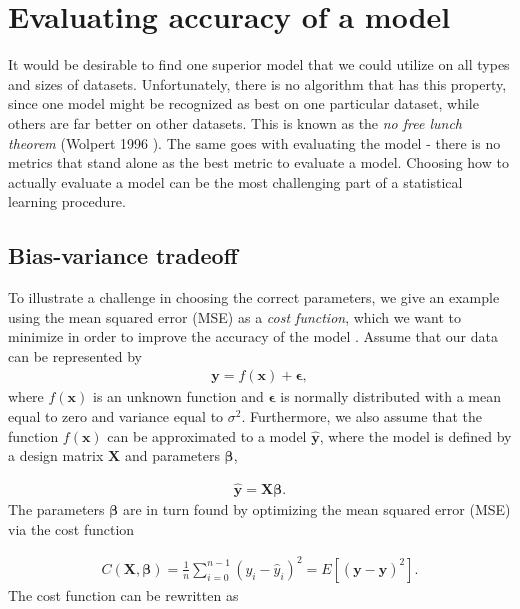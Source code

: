 \section{Evaluating accuracy of a model}
\label{evaluating accuracy}
It would be desirable to find one superior model that we could utilize on all types and sizes of datasets. Unfortunately, there is no algorithm that has this property, since one model might be recognized as best on one particular dataset, while others are far better on other datasets. This is known as the \textit{no free lunch theorem} (Wolpert 1996 \cite{Wolpert1996}). The same goes with evaluating the model - there is no metrics that stand alone as the best metric to evaluate a model. Choosing how to actually evaluate a model can be the most challenging part of a statistical learning procedure.

\subsection{Bias-variance tradeoff}

To illustrate a challenge in choosing the correct parameters, we give an example using the mean squared error (MSE) as a \textit{cost function}, which we want to minimize in order to improve the accuracy of the model \cite{Murphy2012}. Assume that our data can be represented by
\begin{align*}
\boldsymbol{y}=f(\boldsymbol{x}) + \boldsymbol{\epsilon},
\end{align*}
where $f(\boldsymbol{x})$ is an unknown function and $\boldsymbol{\epsilon}$ is normally distributed with a mean equal to zero and variance equal to $\sigma^2$. Furthermore, we also assume that the function $f(\boldsymbol{x})$ can be approximated to a model $\boldsymbol{\hat{y}}$, where the model is defined by a design matrix $\boldsymbol{X}$ and parameters $\boldsymbol{\beta}$,

\begin{align*}
\boldsymbol{\hat{y}} = \boldsymbol{X}\boldsymbol{\beta}.
\end{align*}
The parameters $\boldsymbol{\beta}$ are in turn found by optimizing the mean squared error (MSE) via the cost function

\begin{align*}
C(\boldsymbol{X},\boldsymbol{\beta}) =\frac{1}{n}\sum_{i=0}^{n-1}(y_i-\hat{y}_i)^2= E\left[(\boldsymbol{y}-\boldsymbol{\hat{y}})^2\right].
\end{align*}
The cost function can be rewritten as

